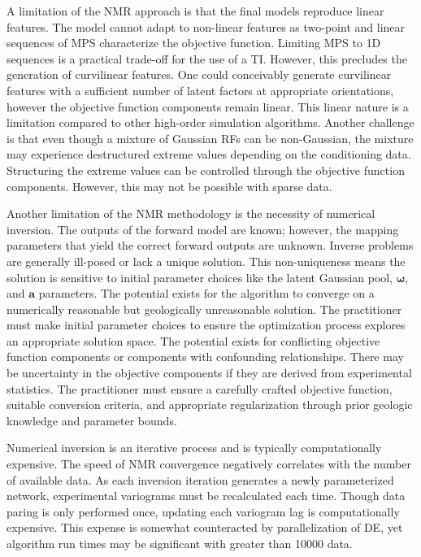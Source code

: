 A limitation of the \gls{NMR} approach is that the final models reproduce linear features. The model cannot adapt to non-linear features as two-point and linear sequences of \gls{MPS} characterize the objective function. Limiting \gls{MPS} to \gls{1D} sequences is a practical trade-off for the use of a \gls{TI}. However, this precludes the generation of curvilinear features. One could conceivably generate curvilinear features with a sufficient number of latent factors at appropriate orientations, however the objective function components remain linear. This linear nature is a limitation compared to other high-order simulation algorithms. Another challenge is that even though a mixture of Gaussian \glspl{RF} can be non-Gaussian, the mixture may experience destructured extreme values depending on the conditioning data. Structuring the extreme values can be controlled through the objective function components. However, this may not be possible with sparse data.

Another limitation of the \gls{NMR} methodology is the necessity of numerical inversion. The outputs of the forward model are known; however, the mapping parameters that yield the correct forward outputs are unknown. Inverse problems are generally ill-posed or lack a unique solution. This non-uniqueness means the solution is sensitive to initial parameter choices like the latent Gaussian pool, $\pmb{\omega}$, and $\pmb{a}$ parameters. The potential exists for the algorithm to converge on a numerically reasonable but geologically unreasonable solution. The practitioner must make initial parameter choices to ensure the optimization process explores an appropriate solution space. The potential exists for conflicting objective function components or components with confounding relationships. There may be uncertainty in the objective components if they are derived from experimental statistics. The practitioner must ensure a carefully crafted objective function, suitable conversion criteria, and appropriate regularization through prior geologic knowledge and parameter bounds.

Numerical inversion is an iterative process and is typically computationally expensive. The speed of \gls{NMR} convergence negatively correlates with the number of available data. As each inversion iteration generates a newly parameterized network, experimental variograms must be recalculated each time. Though data paring is only performed once, updating each variogram lag is computationally expensive. This expense is somewhat counteracted by parallelization of \gls{DE}, yet algorithm run times may be significant with greater than 10000 data.

